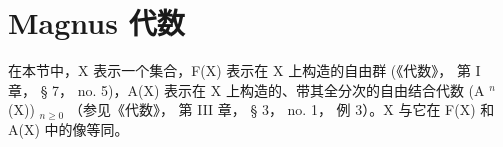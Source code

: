 \section{Magnus 代数}

在本节中，X 表示一个集合，F(X) 表示在 X 上构造的自由群 (《代数》， 第 I 章， § 7， no. 5)，A(X) 表示在 X 上构造的、带其全分次的自由结合代数 (A \(^{n}\) (X)) \(_{n\geqslant0}\) （参见《代数》， 第 III 章， § 3， no. 1， 例 3）。X 与它在 F(X) 和 A(X) 中的像等同。

